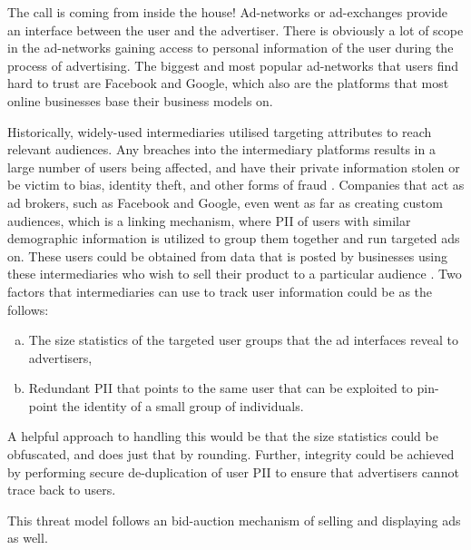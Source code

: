 \documentclass[sigconf,nonacm]{acmart}
\begin{document}
The call is coming from inside the house! Ad-networks or ad-exchanges provide an interface between the user and the advertiser. There is obviously a lot of scope in the ad-networks gaining access to personal information of the user during the process of advertising. The biggest and most popular ad-networks that users find hard to trust are Facebook and Google, which also are the platforms that most online businesses base their business models on.

Historically, widely-used intermediaries utilised targeting attributes to reach relevant audiences. Any breaches into the intermediary platforms results in a large number of users being affected, and have their private information stolen or be victim to bias, identity theft, and other forms of fraud \cite{discriminationoptimisation}. Companies that act as ad brokers, such as Facebook and Google, even went as far as creating custom audiences, which is a linking mechanism, where PII of users with similar demographic information is utilized to group them together and run targeted ads on. These users could be obtained from data that is posted by businesses using these intermediaries who wish to sell their product to a particular audience . Two factors that intermediaries can use to track user information could be as the follows:

\begin{enumerate}[a.]
    \item The size statistics of the targeted user groups that the ad interfaces reveal to advertisers,
    \item Redundant PII that points to the same user that can be exploited to pin-point the identity of a small group of individuals. 
\end{enumerate}

A helpful approach to handling this would be that the size statistics could be obfuscated, and \cite{privrisks} does just that by rounding. Further, integrity could be achieved by performing secure de-duplication of user PII to ensure that advertisers cannot trace back to users. 

This threat model follows an bid-auction mechanism of selling and displaying ads as well. 
\end{document}
